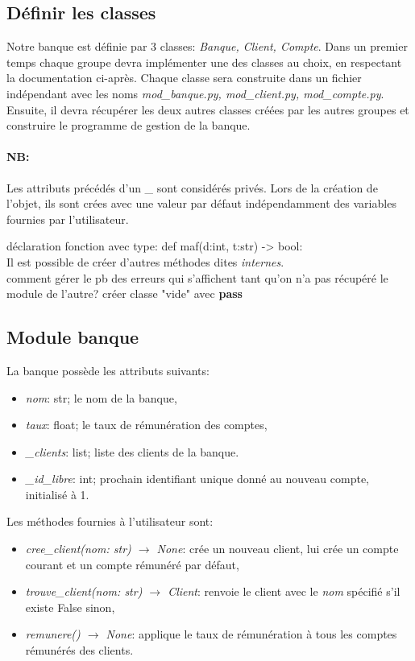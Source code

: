 \documentclass[a4paper,11pt]{article}
\begin{document}
\begin{Form}
\section{Définir les classes}
Notre banque est définie par 3 classes: \emph{Banque, Client, Compte}. Dans un premier temps chaque groupe devra implémenter une des classes au choix, en respectant la documentation ci-après. Chaque classe sera construite dans un fichier indépendant avec les noms \emph{mod\_banque.py, mod\_client.py, mod\_compte.py}. Ensuite, il devra récupérer les deux autres classes créées par les autres groupes et construire le programme de gestion de la banque.
\paragraph{NB:}Les attributs précédés d'un \_ sont considérés privés. Lors de la création de l'objet, ils sont crées avec une valeur par défaut indépendamment des variables fournies par l'utilisateur. 
\begin{commentprof}
déclaration fonction avec type:
def maf(d:int, t:str) -> bool:
\\Il est possible de créer d'autres méthodes dites \emph{internes}.\\
comment gérer le pb des erreurs qui s'affichent tant qu'on n'a pas récupéré le module de l'autre? créer classe "vide" avec \textbf{pass}
\end{commentprof}
\subsection{Module banque}
La banque possède les attributs suivants:
\begin{itemize}
\item \emph{nom}: str; le nom de la banque,
\item \emph{taux}: float; le taux de rémunération des comptes,
\item \emph{\_clients}: list; liste des clients de la banque.
\item \emph{\_id\_libre}: int; prochain identifiant unique donné au nouveau compte, initialisé à 1.
\end{itemize}
Les méthodes fournies à l'utilisateur sont:
\begin{itemize}
\item\emph{cree\_client(nom: str) $\rightarrow$ None}: crée un nouveau client, lui crée un compte courant et un compte rémunéré par défaut,
\item \emph{trouve\_client(nom: str) $\rightarrow$ Client}: renvoie le client avec le \emph{nom} spécifié s'il existe False sinon,
\item \emph{remunere() $\rightarrow$ None}: applique le taux de rémunération à tous les comptes rémunérés des clients.
\end{itemize}

\end{Form}
\end{document}
